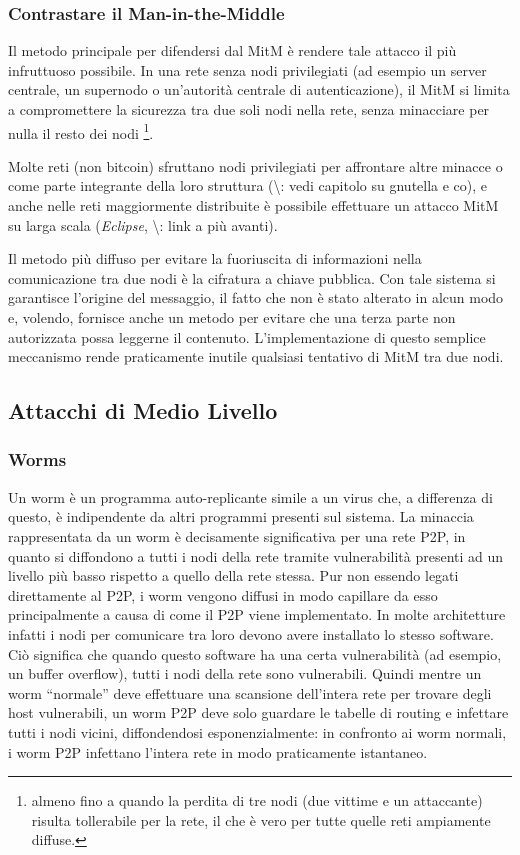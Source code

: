 \subsubsection{Contrastare il
Man-in-the-Middle}\label{contrastare-il-man-in-the-middle}

Il metodo principale per difendersi dal MitM è rendere tale attacco il
più infruttuoso possibile. In una rete senza nodi privilegiati (ad
esempio un server centrale, un supernodo o un'autorità centrale di
autenticazione), il MitM si limita a compromettere la sicurezza tra due
soli nodi nella rete, senza minacciare per nulla il resto dei nodi
\footnote{almeno fino a quando la perdita di tre nodi (due vittime e un
  attaccante) risulta tollerabile per la rete, il che è vero per tutte
  quelle reti ampiamente diffuse.}.

Molte reti (non bitcoin) sfruttano nodi privilegiati per affrontare
altre minacce o come parte integrante della loro struttura
(\textbackslash{}\TODO: vedi capitolo su gnutella e co), e anche nelle
reti maggiormente distribuite è possibile effettuare un attacco MitM su
larga scala (\emph{Eclipse}, \textbackslash{}\TODO: link a più avanti).

Il metodo più diffuso per evitare la fuoriuscita di informazioni nella
comunicazione tra due nodi è la cifratura a chiave pubblica. Con tale
sistema si garantisce l'origine del messaggio, il fatto che non è stato
alterato in alcun modo e, volendo, fornisce anche un metodo per evitare
che una terza parte non autorizzata possa leggerne il contenuto.
L'implementazione di questo semplice meccanismo rende praticamente
inutile qualsiasi tentativo di MitM tra due nodi.

\subsection{Attacchi di Medio Livello}\label{attacchi-di-medio-livello}

\subsubsection{Worms}\label{worms}

Un worm è un programma auto-replicante simile a un virus che, a
differenza di questo, è indipendente da altri programmi presenti sul
sistema. La minaccia rappresentata da un worm è decisamente
significativa per una rete P2P, in quanto si diffondono a tutti i nodi
della rete tramite vulnerabilità presenti ad un livello più basso
rispetto a quello della rete stessa. Pur non essendo legati direttamente
al P2P, i worm vengono diffusi in modo capillare da esso principalmente
a causa di come il P2P viene implementato. In molte architetture infatti
i nodi per comunicare tra loro devono avere installato lo stesso
software. Ciò significa che quando questo software ha una certa
vulnerabilità (ad esempio, un buffer overflow), tutti i nodi della rete
sono vulnerabili. Quindi mentre un worm ``normale'' deve effettuare una
scansione dell'intera rete per trovare degli host vulnerabili, un worm
P2P deve solo guardare le tabelle di routing e infettare tutti i nodi
vicini, diffondendosi esponenzialmente: in confronto ai worm normali, i
worm P2P infettano l'intera rete in modo praticamente istantaneo.

